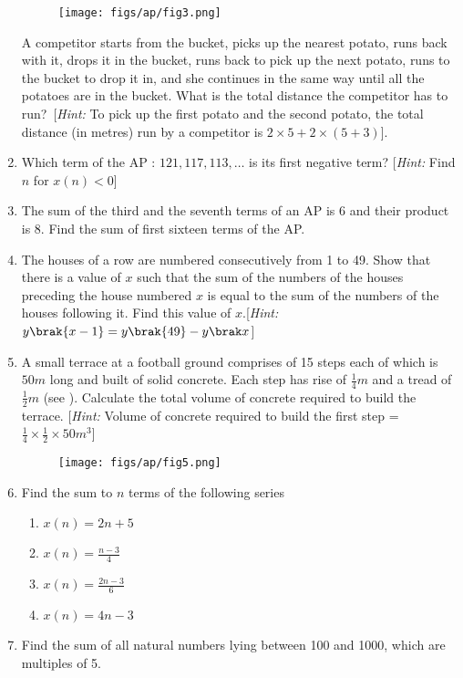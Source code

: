 \begin{enumerate}[label=\thesubsection.\arabic*, ref=\thesubsection.\theenumi]
\begin{figure}[H]
		\centering
\texttt{[image: figs/ap/fig3.png]} 
		\caption{}
		\label{fig:fig3}
	\end{figure}
A competitor starts from the bucket,  picks up the nearest potato,  runs back with it,  drops it in the bucket,  runs back to pick up the next potato,  runs to the bucket to drop it in,  and she continues in the same way until all the potatoes are in the bucket. What is the total distance the competitor has to run?\
[{\em Hint:} To pick up the first potato and the second potato,  the total distance (in metres)
run by a competitor is $2 \times 5 + 2 \times (5 + 3)$].
\item Which term of the AP : $121,  117,  113, \dots $ is its first negative term? [{\em Hint:} Find $n$ for $x(n) < 0$]
\item The sum of the third and the seventh terms of an AP is 6 and their product is 8. Find the sum of first sixteen terms of the AP.
\item The houses of a row are numbered consecutively from 1 to 49. Show that there is a value of $x$ such that the sum of the numbers of the houses preceding the house numbered $x$ is equal to the sum of the numbers of the houses following it. Find this value of $x$.[{\em Hint:} $y\brak {x-1} = y\brak {49} -y\brak x$]
\item A small terrace at a football ground comprises of 15 steps each of which is $50 m$ long and built of solid concrete. Each step has rise of $\frac{1}{4}m$ and a tread of $\frac{1}{2}m$ 
	(see \figref{fig:fig5}).
	Calculate the total volume of concrete required to build the terrace. [{\em Hint:} Volume of concrete required to build the first step = $\frac{1}{4} \times \frac{1}{2} \times 50m^3$]
	\begin{figure}[H]
		\centering
\texttt{[image: figs/ap/fig5.png]}  
		\caption{}
		\label{fig:fig5}
	\end{figure}
\item Find the sum to $n$ terms of the following series
	\begin{multicols}{4}
\begin{enumerate}
	\item $x(n) =2n+5$
	\item $x(n) =\frac{n-3}{4}$
\item $x(n) = \frac{2n-3}{6}$
\item $x(n) = 4n-3 $
\end{enumerate}
\end{multicols}
\item Find the sum of all natural numbers lying between 100 and 1000,  which are multiples of 5.

\end{enumerate}
